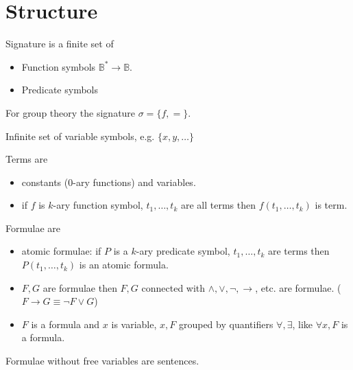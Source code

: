 \section{Structure}

\begin{definition} Signature is a finite set of 
\begin{itemize}
\item
   Function symbols $\mathbb{B}^* \rightarrow \mathbb{B}$.
\item
  Predicate symbols
\end{itemize}
\end{definition}

\begin{observation}
For group theory the signature $\sigma = \{ f, = \}$.
\end{observation}

\begin{definition}[Variable]
Infinite set of variable symbols, e.g. \(\{x,y,\dots\}\)
\end{definition}

\begin{definition}[Terms] Terms are
\begin{itemize}
\item
  constants ($0$-ary functions) and variables.
\item
  if \(f\) is \(k\)-ary function symbol, \(t_1,\dots,t_k\) are all terms
  then \(f(t_1, \dots, t_k)\) is term.
\end{itemize}
\end{definition}

\begin{definition}[Formulae] Formulae are
\begin{itemize}
\item
  atomic formulae: if $P$ is a $k$-ary predicate symbol, $t_1, \dots, t_k$ are
  terms then $P(t_1,\dots,t_k)$ is an atomic formula.
\item
  $F,G$ are formulae then $F,G$ connected with $\land, \lor, \lnot, \rightarrow$, etc. are formulae. ($F \rightarrow G \equiv \lnot F \lor G$)
\item
  $F$ is a formula and $x$ is variable, $x, F$ grouped by quantifiers $\forall, \exists$, like $\forall x, F$ is a formula.
\end{itemize}
\end{definition}

\begin{definition}[Sentences]
Formulae without free variables are sentences.
\end{definition}

